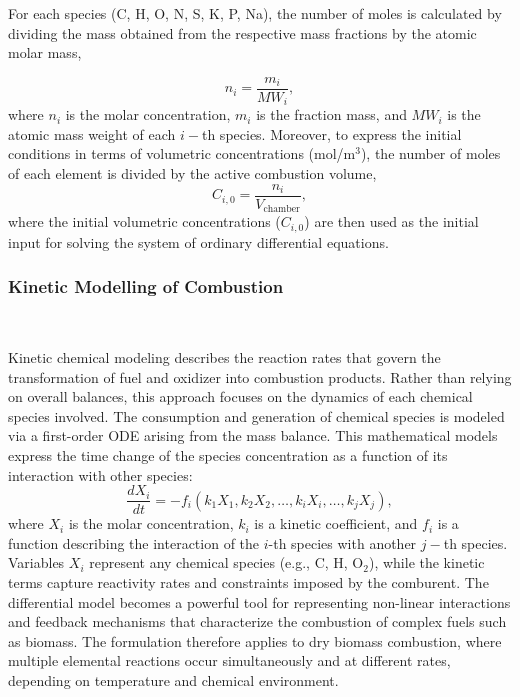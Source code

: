 \documentclass[preprint,12pt]{elsarticle}
\begin{document}
For each species (C, H, O, N, S, K, P, Na), the number of moles is calculated by dividing the mass obtained from the respective mass fractions by the atomic molar mass,

\begin{equation}
\label{mol}
n_i = \frac{m_i}{MW_i},
\end{equation}
where $n_i$ is the molar concentration, $m_i$ is the fraction mass, and $MW_i$ is the atomic mass weight of each $i-$th species. Moreover, to express the initial conditions in terms of volumetric concentrations (mol/m$^3$), the number of moles of each element is divided by the active combustion volume,
\begin{equation}
\label{volumetricX}
C_{i,0} = \frac{n_i}{V_{\text{chamber}}},
\end{equation}
where the initial volumetric concentrations ($C_{i,0}$) are then used as the initial input for solving the system of ordinary differential equations.

\subsubsection{Kinetic Modelling of Combustion}\\
\label{Kinetic Modelling of Comustion}

Kinetic chemical modeling describes the reaction rates that govern the transformation of fuel and oxidizer into combustion products. Rather than relying on overall balances, this approach focuses on the dynamics of each chemical species involved. 
The consumption and generation of chemical species is modeled via a first-order ODE arising from the mass balance. This mathematical models express the time change of the species concentration as a function of its interaction with other species:
\begin{equation}
    \frac{dX_i}{dt} = - f_i (k_1 X_1,k_2X_2,\ldots,k_iX_i,\ldots,k_jX_j),
\end{equation}
where $X_i$ is the molar concentration, $k_i$ is a kinetic coefficient, and $f_i$ is a function describing the interaction of the $i$-th species with another $j-$th species.\\

Variables $X_i$ represent any chemical species (e.g., C, H, O$_2$), while the kinetic terms capture reactivity rates and constraints imposed by the comburent. The differential model becomes a powerful tool for representing non-linear interactions and feedback mechanisms that characterize the combustion of complex fuels such as biomass. The formulation therefore applies to dry biomass combustion, where multiple elemental reactions occur simultaneously and at different rates, depending on temperature and chemical environment.\\
\end{document}
